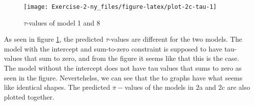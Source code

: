 \documentclass[
]{article}
\newenvironment{Shaded}{\begin{snugshade}}{\end{snugshade}}
\newcommand{\AttributeTok}[1]{\textcolor[rgb]{0.77,0.63,0.00}{#1}}
\newcommand{\DecValTok}[1]{\textcolor[rgb]{0.00,0.00,0.81}{#1}}
\newcommand{\FunctionTok}[1]{\textcolor[rgb]{0.00,0.00,0.00}{#1}}
\newcommand{\NormalTok}[1]{#1}
\newcommand{\SpecialCharTok}[1]{\textcolor[rgb]{0.00,0.00,0.00}{#1}}
\newcommand{\StringTok}[1]{\textcolor[rgb]{0.31,0.60,0.02}{#1}}
\begin{document}
\begin{figure}

{\centering \texttt{[image: Exercise-2-ny\_files/figure-latex/plot-2c-tau-1]} 

}

\caption{$\tau$-values of model 1 and 8}\label{fig:plot-2c-tau}
\end{figure}

As seen in figure \ref{fig:plot-2c-tau}, the predicted \(\tau\)-values are different for the two models. The model
with the intercept and sum-to-zero constraint is supposed to have tau-values that sum to zero, and
from the figure it seems like that this is the case. The model without the intercept does not have tauvalues that sums to zero as seen in the figure. Nevertehelss, we can see that the to graphs have what seems like identical shapes.
The predicted \(\pi-\)values of the models in 2a and 2c are also plotted together.

\begin{Shaded}
\end{Shaded}
\end{document}
